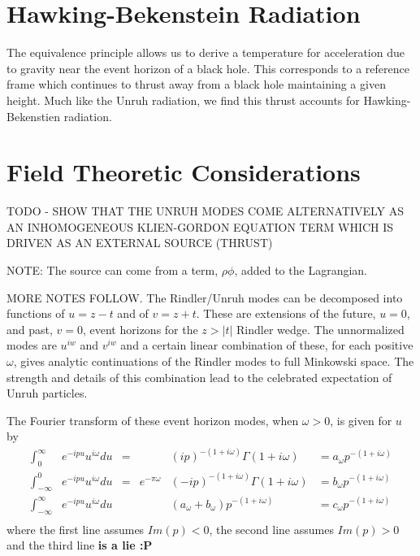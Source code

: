 \documentclass[12pt,a4paper]{article}
\begin{document}
\section{Hawking-Bekenstein Radiation}

The equivalence principle allows us to derive a temperature for acceleration due to gravity near the event horizon of a black hole.  This corresponds to a reference frame which continues to thrust away from a black hole maintaining a given height.  Much like the Unruh radiation, we find this thrust accounts for Hawking-Bekenstien radiation.

\section{Field Theoretic Considerations}
TODO - SHOW THAT THE UNRUH MODES COME ALTERNATIVELY AS AN INHOMOGENEOUS KLIEN-GORDON EQUATION TERM WHICH IS DRIVEN AS AN EXTERNAL SOURCE (THRUST)
\cite{beisert}


NOTE: The source can come from a term, $\rho \phi$, added to the Lagrangian.


MORE NOTES FOLLOW. The Rindler/Unruh modes can be decomposed into functions of $u = z-t$ and of $v = z+t$.  These are extensions of the future, $u=0$, and past, $v=0$, event horizons for the $z>|t|$ Rindler wedge.  The unnormalized modes are $u^{iw}$ and $v^{iw}$ and a certain linear combination of these, for each positive $\omega$, gives analytic continuations of the Rindler modes to full Minkowski space.  The strength and details of this combination lead to the celebrated expectation of Unruh particles.

The Fourier transform of these event horizon modes, when $\omega > 0$, is given for $u$ by
\[
\begin{aligned}
\int_0^\infty         & e^{-i p u} u^{i\omega} du &=&             &(i p)^{-(1 + i\omega)}\Gamma(1 + i\omega)              & = a_\omega p^{-(1 + i\omega)} \\
\int_{-\infty}^0       & e^{-i p u} u^{i\omega} du &=& e^{-\pi\omega}&(-i p)^{-(1 + i\omega)}\Gamma(1 + i\omega) & = b_\omega p^{-(1 + i\omega)} \\
\int_{-\infty}^\infty   & e^{-i p u} u^{i\omega} du & &            & (a_\omega + b_\omega) p^{-(1 + i\omega)}               & = c_\omega p^{-(1 + i\omega)} \\
\end{aligned}
\]
where the first line assumes $Im(p) < 0$, the second line assumes $Im(p) > 0$ and the third line {\bf is a lie :P}
\end{document}
